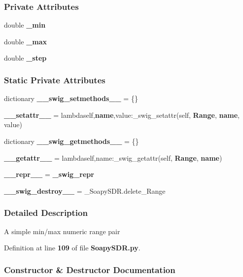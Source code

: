 \subsubsection*{Private Attributes}
\begin{DoxyCompactItemize}
\item 
double {\bf \+\_\+min}
\item 
double {\bf \+\_\+max}
\item 
double {\bf \+\_\+step}
\end{DoxyCompactItemize}
\subsubsection*{Static Private Attributes}
\begin{DoxyCompactItemize}
\item 
dictionary {\bf \+\_\+\+\_\+swig\+\_\+setmethods\+\_\+\+\_\+} = \{\}
\item 
{\bf \+\_\+\+\_\+setattr\+\_\+\+\_\+} = lambdaself,{\bf name},value\+:\+\_\+swig\+\_\+setattr(self, {\bf Range}, {\bf name}, value)
\item 
dictionary {\bf \+\_\+\+\_\+swig\+\_\+getmethods\+\_\+\+\_\+} = \{\}
\item 
{\bf \+\_\+\+\_\+getattr\+\_\+\+\_\+} = lambdaself,name\+:\+\_\+swig\+\_\+getattr(self, {\bf Range}, {\bf name})
\item 
{\bf \+\_\+\+\_\+repr\+\_\+\+\_\+} = {\bf \+\_\+swig\+\_\+repr}
\item 
{\bf \+\_\+\+\_\+swig\+\_\+destroy\+\_\+\+\_\+} = \+\_\+\+Soapy\+S\+D\+R.\+delete\+\_\+\+Range
\end{DoxyCompactItemize}


\subsubsection{Detailed Description}
A simple min/max numeric range pair 

Definition at line {\bf 109} of file {\bf Soapy\+S\+D\+R.\+py}.



\subsubsection{Constructor \& Destructor Documentation}

